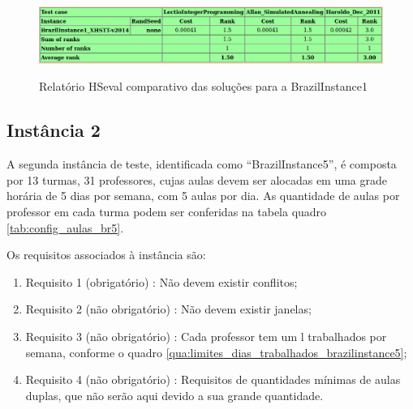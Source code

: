 \begin{figure}[h]
	\centering
	\caption{Relatório HSeval comparativo das soluções para a BrazilInstance1}
	\includegraphics[width=1\textwidth]{./dados/figuras/benchmark_instance1}
	\label{fig:rankin_brazilinstance1}
\end{figure}

\clearpage
\subsection{Instância 2}

A segunda instância de teste, identificada como ``BrazilInstance5'', é composta por 13 turmas, 31 professores, cujas aulas devem ser alocadas em uma grade horária de 5 dias por semana, com 5 aulas por dia. As quantidade de aulas por professor em cada turma podem ser conferidas na tabela quadro \ref{tab:config_aulas_br5}.



\newpage
Os requisitos associados à instância são:
\begin{enumerate}
	\item Requisito 1 (obrigatório) : Não devem existir conflitos;
	\item Requisito 2 (não obrigatório) : Não devem existir janelas;
	\item Requisito 3 (não obrigatório) : Cada professor tem um l trabalhados por semana, conforme o quadro \ref{qua:limites_dias_trabalhados_brazilinstance5};
	\item Requisito 4 (não obrigatório) : Requisitos de quantidades mínimas de aulas duplas, que não serão aqui  devido a sua grande quantidade.
\end{enumerate}


